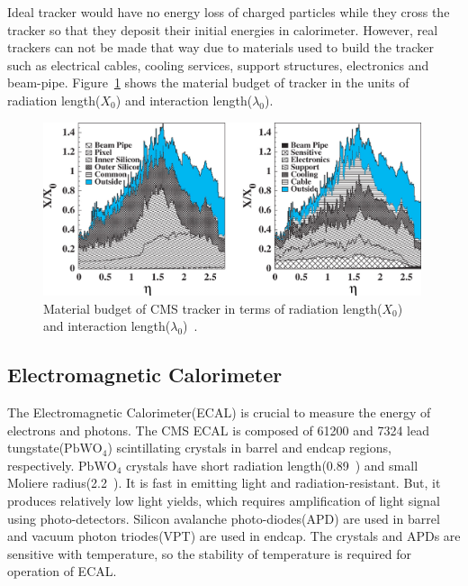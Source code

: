 Ideal tracker would have no energy loss of charged particles 
while they cross the tracker so that they deposit their initial 
energies in calorimeter. However, real trackers can not be made 
that way due to materials used to build the tracker such as 
electrical cables, cooling services, support structures, 
electronics and beam-pipe. Figure~\ref{fig:trackermaterial} shows 
the material budget of tracker in the units of radiation length($X_0$) 
and interaction length($\lambda_0$). 
%
\begin{figure}[ht!] 
\vspace{1cm}
\centering 
\includegraphics[width=0.99\textwidth]{figures/trackermaterial.jpeg}
\caption{Material budget of CMS tracker in terms of radiation length($X_0$)
and interaction length($\lambda_0$)~\cite{Abbaneo2004331}.} 
\label{fig:trackermaterial} 
\end{figure} 



\subsection{Electromagnetic Calorimeter} 

The Electromagnetic Calorimeter(ECAL) is crucial to measure the energy 
of electrons and photons. The CMS ECAL is composed of 61200 and 7324 
lead tungstate($\textrm{PbWO}_4$) scintillating crystals in barrel and 
endcap regions, respectively. $\textrm{PbWO}_4$ crystals have short 
radiation length(0.89~\cm) and small Moliere radius(2.2~\cm). 
It is fast in emitting light and radiation-resistant. 
But, it produces relatively low light yields, which requires amplification 
of light signal using photo-detectors. Silicon avalanche photo-diodes(APD)
are used in barrel and vacuum photon triodes(VPT) are used in endcap.
The crystals and APDs are sensitive with temperature, so the stability
of temperature is required for operation of ECAL. 

